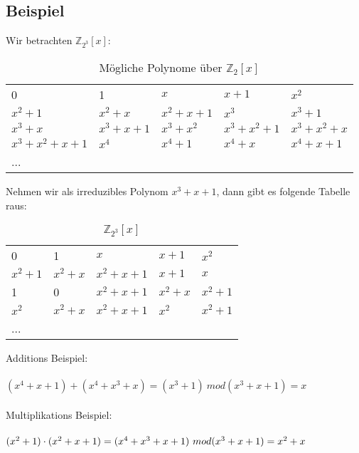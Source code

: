 \subsection*{Beispiel}

Wir betrachten  $\mathbb{Z}_{2^3}[x]$:\\

\begin{table}[!ht]
    \begin{tabular}{lllll}
    0             & 1         & $x$       & $x+1$       & $x^2$       \\
    $x^2+1$       & $x^2+x$   & $x^2+x+1$ & $x^3$       & $x^3+1$     \\
    $x^3+x$       & $x^3+x+1$ & $x^3+x^2$ & $x^3+x^2+1$ & $x^3+x^2+x$ \\
    $x^3+x^2+x+1$ & $x^4$     & $x^4+1$   & $x^4+x$     & $x^4+x+1$   \\
    ...           &           &           &             &            
    \end{tabular}
    \caption{Mögliche Polynome über $\mathbb{Z}_2 [x]$}
    \end{table}
Nehmen wir als irreduzibles Polynom $ x^3 + x + 1$, dann gibt es folgende Tabelle raus:\\
\begin{table}[!ht]
    \begin{tabular}{lllll}
    0       & 1       & $x$       & $x+1$   & $x^2$   \\
    $x^2+1$ & $x^2+x$ & $x^2+x+1$ & $x+1$   & $x$     \\
    1       & 0       & $x^2+x+1$ & $x^2+x$ & $x^2+1$ \\
    $x^2$   & $x^2+x$ & $x^2+x+1$ & $x^2$   & $x^2+1$ \\
    ...     &         &           &         &        
    \end{tabular}
    \caption{$\mathbb{Z}_{2^3}[x]$}
    \end{table}


    Additions Beispiel:\\
    \\
    $ (x^4+x+1) + (x^4+x^3+x) = (x^3+1)\ mod (x^3 + x + 1) = x $\\
    \\

    Multiplikations Beispiel:\\
    \\
    $
    (x^2+1) \cdot (x^2+x+1) = (x^4+x^3+x+1) \ mod (x^3 + x + 1) = x^2 + x\\
    $
    \\
